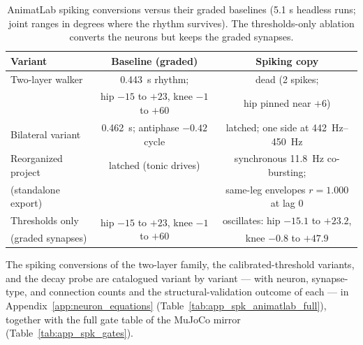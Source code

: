 \begin{table}[htbp]
\caption{AnimatLab spiking conversions versus their graded baselines (5.1 s headless runs; joint ranges in degrees where the rhythm survives). The thresholds-only ablation converts the neurons but keeps the graded synapses.}
\label{tab:spike_animatlab}
\begin{tabular}{@{}lcc@{}}
\toprule
\textbf{Variant} & \textbf{Baseline (graded)} & \textbf{Spiking copy} \\
\midrule
Two-layer walker     & \qty{0.443}{\second} rhythm;   & dead (2 spikes; \\
                     & hip $-15$ to $+23$, knee $-1$ to $+60$ & hip pinned near $+6$) \\
Bilateral variant    & \qty{0.462}{\second}; antiphase $-0.42$ cycle & latched; one side at \qty{442}{\hertz}--\qty{450}{\hertz} \\
Reorganized project  & latched (tonic drives) & synchronous \qty{11.8}{\hertz} co-bursting; \\
(standalone export)  &                        & same-leg envelopes $r = 1.000$ at lag 0 \\
Thresholds only      & \multirow{2}{*}{hip $-15$ to $+23$, knee $-1$ to $+60$} & oscillates: hip $-15.1$ to $+23.2$, \\
(graded synapses)    &                        & knee $-0.8$ to $+47.9$ \\
\bottomrule
\end{tabular}
\end{table}

The spiking conversions of the two-layer family, the calibrated-threshold variants, and the decay probe are catalogued variant by variant --- with neuron, synapse-type, and connection counts and the structural-validation outcome of each --- in Appendix~\ref{app:neuron_equations} (Table~\ref{tab:app_spk_animatlab_full}), together with the full gate table of the MuJoCo mirror (Table~\ref{tab:app_spk_gates}).
